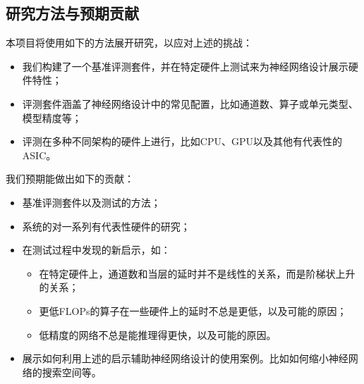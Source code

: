 \subsection{研究方法与预期贡献}
本项目将使用如下的方法展开研究，以应对上述的挑战：
\begin{itemize}
    \item 我们构建了一个基准评测套件，并在特定硬件上测试来为神经网络设计展示硬件特性；
    \item 评测套件涵盖了神经网络设计中的常见配置，比如通道数、算子或单元类型、模型精度等；
    \item 评测在多种不同架构的硬件上进行，比如CPU、GPU以及其他有代表性的ASIC。
\end{itemize}

我们预期能做出如下的贡献：
\begin{itemize}
    \item 基准评测套件以及测试的方法；
    \item 系统的对一系列有代表性硬件的研究；
    \item 在测试过程中发现的新启示，如：
    \begin{itemize}
        \item 在特定硬件上，通道数和当层的延时并不是线性的关系，而是阶梯状上升的关系；
        \item 更低FLOPs的算子在一些硬件上的延时不总是更低，以及可能的原因；
        \item 低精度的网络不总是能推理得更快，以及可能的原因。
    \end{itemize}
    \item 展示如何利用上述的启示辅助神经网络设计的使用案例。比如如何缩小神经网络的搜索空间等。
\end{itemize}